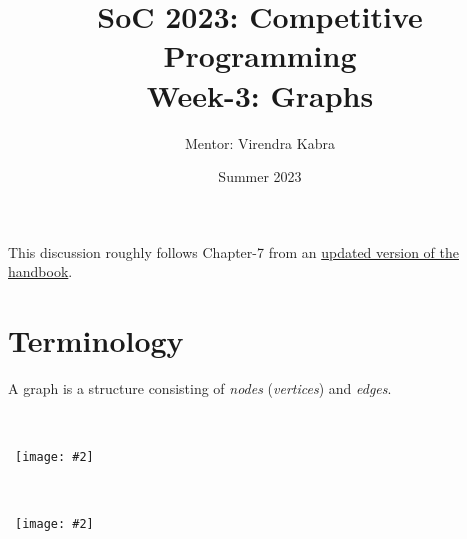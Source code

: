 \documentclass{article}
\title{\textbf{SoC 2023: Competitive Programming \\ {\Large Week-3: Graphs}}}
\author{Mentor: Virendra Kabra}
\date{Summer 2023}
\newcommand{\I}[1]{\textit{#1}}
\newcommand{\image}[2]{\
    \begin{center}\
        \texttt{[image: \#2]}\
    \end{center}\
}
\begin{document}
\begin{sloppypar}       %

    \maketitle
    \tableofcontents
    \thispagestyle{empty}

    \newpage

    \par \noindent This discussion roughly follows Chapter-7 from an \href{https://link.springer.com/book/10.1007/978-3-030-39357-1}{updated version of the handbook}.

    \section{Terminology}

    A graph is a structure consisting of \I{nodes} (\I{vertices}) and \I{edges}.

    \image{0.85}{../images/terms_1.png}
    \image{0.85}{../images/terms_2.png}

    \newpage


\end{sloppypar}
\end{document}
